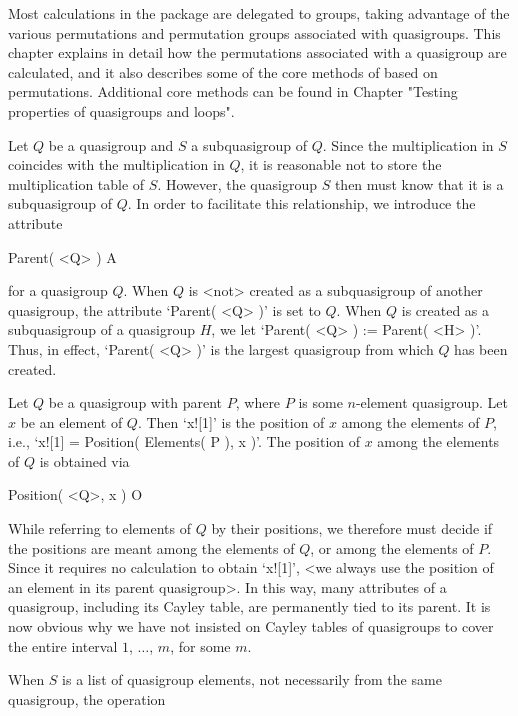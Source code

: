 
Most calculations in the {\LOOPS} package are delegated to groups, taking
advantage of the various permutations and permutation groups associated with
quasigroups. This chapter explains in detail how the permutations associated
with a quasigroup are calculated, and it also describes some of the core
methods of {\LOOPS} based on permutations. Additional core methods can be found
in Chapter "Testing properties of quasigroups and loops".


Let $Q$ be a quasigroup and $S$ a subquasigroup of $Q$. Since the
multiplication in $S$ coincides with the multiplication in $Q$, it is
reasonable not to store the multiplication table of $S$. However, the
quasigroup $S$ then must know that it is a subquasigroup of $Q$. In order to
facilitate this relationship, we introduce the attribute

\>Parent( <Q> ) A

for a quasigroup $Q$. When $Q$ is <not> created as a subquasigroup of
another quasigroup, the attribute `Parent( <Q> )' is set to $Q$. When $Q$ is
created as a subquasigroup of a quasigroup $H$, we let `Parent( <Q> ) :=
Parent( <H> )'. Thus, in effect, `Parent( <Q> )' is the largest quasigroup from
which $Q$ has been created.

Let $Q$ be a quasigroup with parent $P$, where $P$ is some $n$-element
quasigroup. Let $x$ be an element of $Q$. Then `x![1]' is the position of $x$
among the elements of $P$, i.e., `x![1] = Position( Elements( P ), x )'. The
position of $x$ among the elements of $Q$ is obtained via

\>Position( <Q>, x ) O

While referring to elements of $Q$ by their positions, we therefore must decide
if the positions are meant among the elements of $Q$, or among the elements of
$P$. Since it requires no calculation to obtain `x![1]', <we always use the
position of an element in its parent quasigroup>. In this way, many attributes
of a quasigroup, including its Cayley table, are permanently tied to its
parent. It is now obvious why we have not insisted on Cayley tables of
quasigroups to cover the entire interval $1$, $\dots$, $m$, for some $m$.

When $S$ is a list of quasigroup elements, not necessarily from the same
quasigroup, the operation

